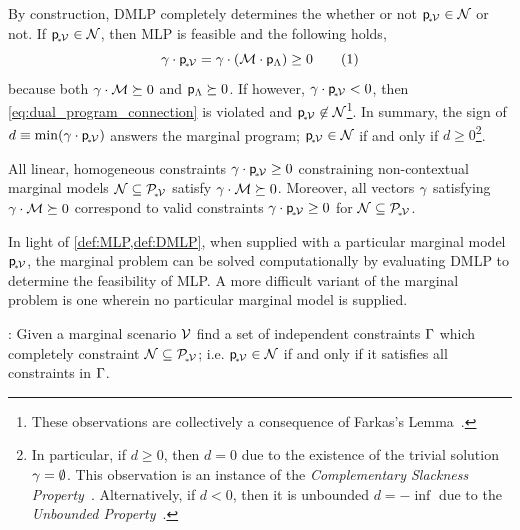\documentclass[aps, 10pt, english, twoside, twocolumn, pra, nofootinbib, tightenlines, longbibliography, superscriptaddress]{revtex4-1}
\begin{document}
    By construction, DMLP completely determines the whether or not ${\mathsf{p}}_{\!{}_*\!\mathcal{V}} \in \mathcal{N}$ or not. If ${\mathsf{p}}_{\!{}_*\!\mathcal{V}} \in \mathcal{N}$, then MLP is feasible and the following holds,
    \[ \ga \cdot \prob{\mscenariowrap} = \ga \cdot \br{\incidence \cdot \prob{\jointvar}} \geq 0 \eq \label{eq:dual_program_connection}\]
    because both $\gamma \cdot \mathcal{M} \succeq 0$ and ${\mathsf{p}}_{\Lambda} \succeq 0$. If however, $\gamma \cdot {\mathsf{p}}_{\!{}_*\!\mathcal{V}} < 0$, then \cref{eq:dual_program_connection} is violated and ${\mathsf{p}}_{\!{}_*\!\mathcal{V}} \not \in \mathcal{N}$\footnote{These observations are collectively a consequence of Farkas's Lemma~\cite{Fang_1993}.}. In summary, the sign of $d \defined \min \br{\ga \cdot \prob{\mscenariowrap}}$ answers the marginal program; ${\mathsf{p}}_{\!{}_*\!\mathcal{V}} \in \mathcal{N}$ if and only if $d \geq 0$\footnote{In particular, if $d \geq 0$, then $d = 0$ due to the existence of the trivial solution $\gamma = \emptyset$. This observation is an instance of the \textit{Complementary Slackness Property}~\cite{Bradley_1977}. Alternatively, if $d < 0$, then it is unbounded $d = -\inf$ due to the \textit{Unbounded Property}~\cite{Bradley_1977}.}.
    \begin{corollary}
        All linear, homogeneous constraints $\gamma \cdot {\mathsf{p}}_{\!{}_*\!\mathcal{V}} \geq 0$ constraining non-contextual marginal models $\mathcal{N} \subseteq \mathcal{P}_{\!{}_*\!\mathcal{V}}$ satisfy $\gamma \cdot \mathcal{M} \succeq 0$. Moreover, all vectors $\gamma$ satisfying $\gamma \cdot \mathcal{M} \succeq 0$ correspond to valid constraints $\gamma \cdot {\mathsf{p}}_{\!{}_*\!\mathcal{V}} \geq 0$ for $\mathcal{N} \subseteq \mathcal{P}_{\!{}_*\!\mathcal{V}}$.
    \end{corollary}

    In light of \cref{def:MLP,def:DMLP}, when supplied with a particular marginal model ${\mathsf{p}}_{\!{}_*\!\mathcal{V}}$, the marginal problem can be solved computationally by evaluating DMLP to determine the feasibility of MLP. A more difficult variant of the marginal problem is one wherein no particular marginal model is supplied.

    \begin{definition}
        : Given a marginal scenario $\mathcal{V}$ find a set of independent constraints $\Gamma$ which completely constraint $\mathcal{N} \subseteq \mathcal{P}_{\!{}_*\!\mathcal{V}}$; i.e. ${\mathsf{p}}_{\!{}_*\!\mathcal{V}} \in \mathcal{N}$ if and only if it satisfies all constraints in $\Gamma$.
    \end{definition}
\end{document}
